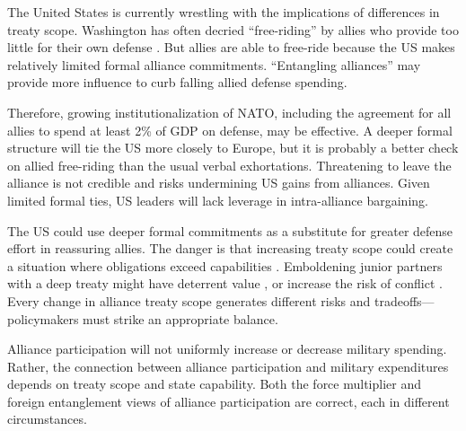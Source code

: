 \documentclass[12pt]{article}
\begin{document}
The United States is currently wrestling with the implications of differences in treaty scope. 
Washington has often decried ``free-riding'' by allies who provide too little for their own defense \citep{Lanoszka2015}. 
But allies are able to free-ride because the US makes relatively limited formal alliance commitments. 
``Entangling alliances'' may provide more influence to curb falling allied defense spending. 

 
Therefore, growing institutionalization of NATO, including the agreement for all allies to spend at least 2\% of GDP on defense, may be effective.
A deeper formal structure will tie the US more closely to Europe, but it is probably a better check on allied free-riding than the usual verbal exhortations. 
Threatening to leave the alliance is not credible and risks undermining US gains from alliances. 
Given limited formal ties, US leaders will lack leverage in intra-alliance bargaining. 


The US could use deeper formal commitments as a substitute for greater defense effort in reassuring allies.
The danger is that increasing treaty scope could create a situation where obligations exceed capabilities \citep{Kennedy1987}. 
Emboldening junior partners with a deep treaty might have deterrent value \citep{Bensonetal2014}, or increase the risk of conflict \citep{Benson2012}.
Every change in alliance treaty scope generates different risks and tradeoffs--- policymakers must strike an appropriate balance. 
 

Alliance participation will not uniformly increase or decrease military spending. 
Rather, the connection between alliance participation and military expenditures depends on treaty scope and state capability.  
Both the force multiplier and foreign entanglement views of alliance participation are correct, each in different circumstances. 




\singlespace
 
 
\end{document}
